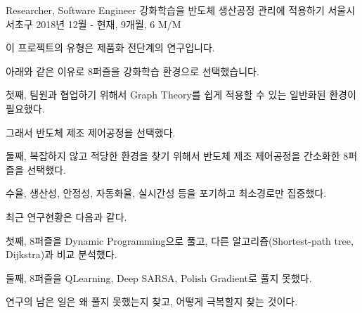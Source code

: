 \begin{cventries}
  \cventry
    {Researcher, Software Engineer} %
    {강화학습을 반도체 생산공정 관리에 적용하기} %
    {서울시 서초구} %
    {2018년 12월 - 현재, 9개월, 6 M/M} %
    {
      \begin{cvitems} %
        \item {이 프로젝트의 유형은 제품화 전단계의 연구입니다.}
        \item {아래와 같은 이유로 8퍼즐을 강화학습 환경으로 선택했습니다.}
        \item {첫째, 팀원과 협업하기 위해서 Graph Theory를 쉽게 적용할 수 있는 일반화된 환경이 필요했다.}
        \item {그래서 반도체 제조 제어공정을 선택했다.}
        \item {둘째, 복잡하지 않고 적당한 환경을 찾기 위해서 반도체 제조 제어공정을 간소화한 8퍼즐을 선택했다.}
        \item {수율, 생산성, 안정성, 자동화율, 실시간성 등을 포기하고 최소경로만 집중했다.}
        \item {최근 연구현황은 다음과 같다.}
        \item {첫째, 8퍼즐을 Dynamic Programming으로 풀고, 다른 알고리즘(Shortest-path tree, Dijkstra)과 비교 분석했다.}
        \item {둘째, 8퍼즐을 QLearning, Deep SARSA, Polish Gradient로 풀지 못했다.}
        \item {연구의 남은 일은 왜 풀지 못했는지 찾고, 어떻게 극복할지 찾는 것이다.}
      \end{cvitems}
    }


\end{cventries}
